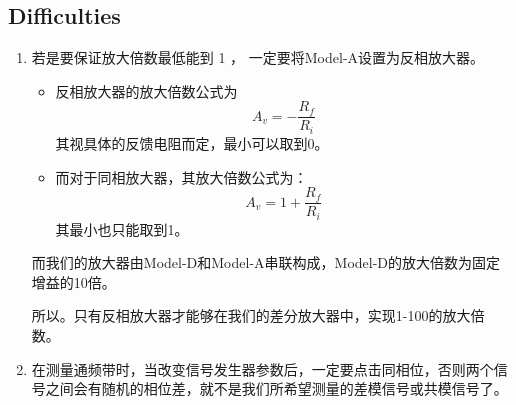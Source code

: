 

\subsection{Difficulties}
\begin{enumerate}
	\item 若是要保证放大倍数最低能到 1 ， 一定要将Model-A设置为反相放大器。
		\begin{itemize}
			\item 反相放大器的放大倍数公式为
				\[
					A_v = -\frac{R_f}{R_i}
				\]
				其视具体的反馈电阻而定，最小可以取到0。

			\item 而对于同相放大器，其放大倍数公式为：
				\[
					A_v = 1 + \frac{R_f}{R_i}
				\]
				其最小也只能取到1。

		\end{itemize}

		而我们的放大器由Model-D和Model-A串联构成，Model-D的放大倍数为固定增益的10倍。

		所以。只有反相放大器才能够在我们的差分放大器中，实现1-100的放大倍数。

	\item 在测量通频带时，当改变信号发生器参数后，一定要点击同相位，否则两个信号之间会有随机的相位差，就不是我们所希望测量的差模信号或共模信号了。
\end{enumerate}
